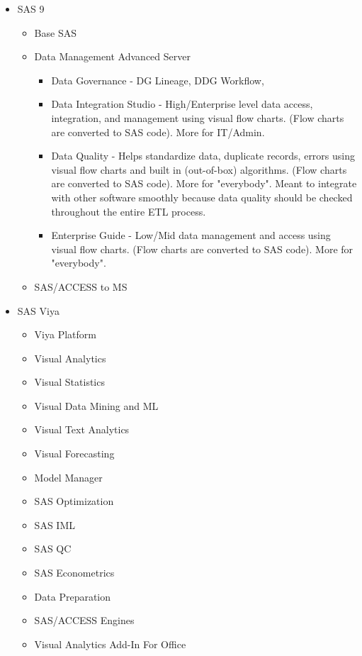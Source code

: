 \newpage
\begin{itemize}
    \item SAS 9
    \begin{itemize}
        \item Base SAS
        \item Data Management Advanced Server
        \begin{itemize}
            \item Data Governance - DG Lineage, DDG Workflow, 
            \item Data Integration Studio - High/Enterprise level data access, integration, and management using visual flow charts. (Flow charts are converted to SAS code). More for IT/Admin.
            \item Data Quality - Helps standardize data, duplicate records, errors using visual flow charts and built in (out-of-box) algorithms. (Flow charts are converted to SAS code). More for "everybody". Meant to integrate with other software smoothly because data quality should be checked throughout the entire ETL process. 
            \item Enterprise Guide - Low/Mid data management and access using visual flow charts. (Flow charts are converted to SAS code). More for "everybody".
        \end{itemize}
        \item SAS/ACCESS to MS
    \end{itemize}
    \item SAS Viya
    \begin{itemize}
        \item Viya Platform
        \item Visual Analytics
        \item Visual Statistics
        \item Visual Data Mining and ML
        \item Visual Text Analytics
        \item Visual Forecasting
        \item Model Manager
        \item SAS Optimization
        \item SAS IML
        \item SAS QC
        \item SAS Econometrics
        \item Data Preparation 
        \item SAS/ACCESS Engines
        \item Visual Analytics Add-In For Office 
    \end{itemize}
\end{itemize}

